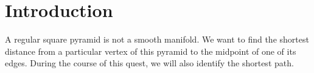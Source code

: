 \section{Introduction}
\label{sec:intro}

A regular square pyramid is not a smooth manifold. We want to find the shortest
distance from a particular vertex of this pyramid to the midpoint of one of its
edges. During the course of this quest, we will also identify the shortest path.
